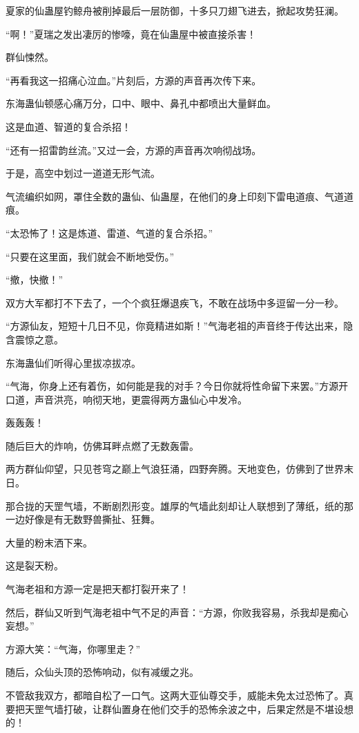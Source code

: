 \begin{this_body}
夏家的仙蛊屋钓鲸舟被削掉最后一层防御，十多只刀翅飞进去，掀起攻势狂澜。

“啊！”夏瑞之发出凄厉的惨嚎，竟在仙蛊屋中被直接杀害！

群仙悚然。

“再看我这一招痛心泣血。”片刻后，方源的声音再次传下来。

东海蛊仙顿感心痛万分，口中、眼中、鼻孔中都喷出大量鲜血。

这是血道、智道的复合杀招！

“还有一招雷韵丝流。”又过一会，方源的声音再次响彻战场。

于是，高空中划过一道道无形气流。

气流编织如网，罩住全数的蛊仙、仙蛊屋，在他们的身上印刻下雷电道痕、气道道痕。

“太恐怖了！这是炼道、雷道、气道的复合杀招。”

“只要在这里面，我们就会不断地受伤。”

“撤，快撤！”

双方大军都打不下去了，一个个疯狂爆退疾飞，不敢在战场中多逗留一分一秒。

“方源仙友，短短十几日不见，你竟精进如斯！”气海老祖的声音终于传达出来，隐含震惊之意。

东海蛊仙们听得心里拔凉拔凉。

“气海，你身上还有着伤，如何能是我的对手？今日你就将性命留下来罢。”方源开口道，声音洪亮，响彻天地，更震得两方蛊仙心中发冷。

轰轰轰！

随后巨大的炸响，仿佛耳畔点燃了无数轰雷。

两方群仙仰望，只见苍穹之巅上气浪狂涌，四野奔腾。天地变色，仿佛到了世界末日。

那合拢的天罡气墙，不断剧烈形变。雄厚的气墙此刻却让人联想到了薄纸，纸的那一边好像是有无数野兽撕扯、狂舞。

大量的粉末洒下来。

这是裂天粉。

气海老祖和方源一定是把天都打裂开来了！

然后，群仙又听到气海老祖中气不足的声音：“方源，你败我容易，杀我却是痴心妄想。”

方源大笑：“气海，你哪里走？”

随后，众仙头顶的恐怖响动，似有减缓之兆。

不管敌我双方，都暗自松了一口气。这两大亚仙尊交手，威能未免太过恐怖了。真要把天罡气墙打破，让群仙置身在他们交手的恐怖余波之中，后果定然是不堪设想的！


\end{this_body}
